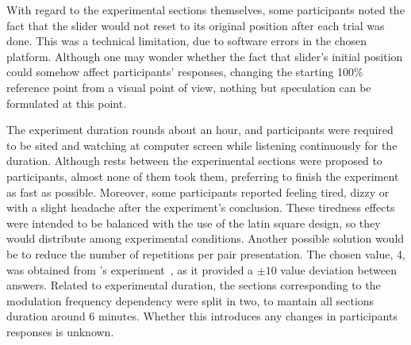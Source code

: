 \documentclass[../main.tex]{subfiles}
\begin{document}
With regard to the experimental sections themselves, some participants noted
the fact that the slider would not reset to its original position after each
trial was done. This was a technical limitation, due to software errors in the
chosen platform. Although one may wonder whether the fact that slider's initial
position could somehow affect participants' responses, changing the starting
100\% reference point from a visual point of view, nothing but speculation
can be formulated at this point.

The experiment duration rounds about an hour, and participants were required to
be sited and watching at computer screen while listening continuously for the
duration. Although rests between the experimental sections were proposed to
participants, almost none of them took them, preferring to finish the experiment
as fast as possible. Moreover, some participants reported feeling tired, dizzy
or with a slight headache after the experiment's conclusion. These tiredness
effects were intended to be balanced with the use of the latin square design,
so they would distribute among experimental conditions. Another possible
solution would be to reduce the number of repetitions per pair presentation.
The chosen value, 4, was obtained from \citeauthor{Fastl1982Fluctuation}'s
experiment~\cite{Fastl1982Fluctuation}, as it provided a $\pm10$ value deviation
between answers. Related to experimental duration, the sections corresponding to
the modulation frequency dependency were split in two, to mantain all sections
duration around 6 minutes. Whether this introduces any changes in participants
responses is unknown.
\end{document}
